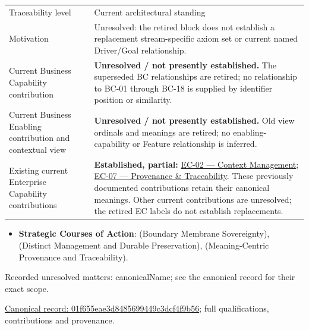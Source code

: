 \begin{longtable}{>{\raggedright\arraybackslash}p{}>{\raggedright\arraybackslash}p{}}
Traceability level & Current architectural standing \\
Motivation & Unresolved: the retired block does not establish a replacement stream-specific axiom set or current named Driver/Goal relationship. \\
Current Business Capability contribution & \textbf{Unresolved / not presently established.} The superseded BC relationships are retired; no relationship to BC-01 through BC-18 is supplied by identifier position or similarity. \\
Current Business Enabling contribution and contextual view & \textbf{Unresolved / not presently established.} Old view ordinals and meanings are retired; no enabling-capability or Feature relationship is inferred. \\
Existing current Enterprise Capability contributions & \textbf{Established, partial:} \href{\detokenize{../../../../../docs/markdown/02-strategy/capabilities/enterprise-capabilities.md#ec-02-context-management}}{EC-02 — Context Management}; \href{\detokenize{../../../../../docs/markdown/02-strategy/capabilities/enterprise-capabilities.md#ec-07-provenance--traceability}}{EC-07 — Provenance \& Traceability}. These previously documented contributions retain their canonical meanings. Other current contributions are unresolved; the retired EC labels do not establish replacements. \\
\end{longtable}


\begin{itemize}


\item \textbf{Strategic Courses of Action}: \texttt{} (Boundary Membrane Sovereignty), \texttt{} (Distinct Management and Durable Preservation), \texttt{} (Meaning-Centric Provenance and Traceability).

\end{itemize}

{\small Recorded unresolved matters: canonicalName; see the canonical record for their exact scope.}\par
{\footnotesize \href{../../../../continuum/strategy/value-stream/01f655eae3d8485699449c3dcf4f9b56.md}{Canonical record: 01f655eae3d8485699449c3dcf4f9b56}; full qualifications, contributions and provenance.}\par
